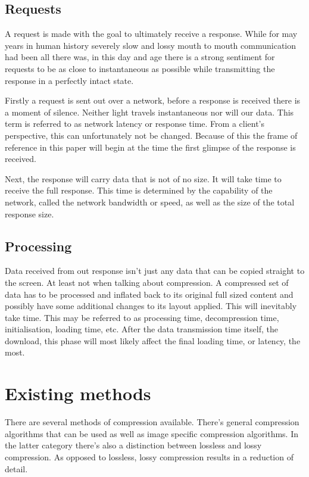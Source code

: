 \documentclass[11pt,a4paper]{report}
\begin{document}
\subsection{Requests}

A request is made with the goal to ultimately receive a response. While for may years in human history severely slow and lossy mouth to mouth communication had been all there was, in this day and age there is a strong sentiment for requests to be as close to instantaneous as possible while transmitting the response in a perfectly intact state.

Firstly a request is sent out over a network, before a response is received there is a moment of silence. Neither light travels instantaneous nor will our data. This term is referred to as network latency or response time. From a client's perspective, this can unfortunately not be changed. Because of this the frame of reference in this paper will begin at the time the first glimpse of the response is received.

Next, the response will carry data that is not of no size. It will take time to receive the full response. This time is determined by the capability of the network, called the network bandwidth or speed, as well as the size of the total response size.

\subsection{Processing}

Data received from out response isn't just any data that can be copied straight to the screen. At least not when talking about compression. A compressed set of data has to be processed and inflated back to its original full sized content and possibly have some additional changes to its layout applied. This will inevitably take time. This may be referred to as processing time, decompression time, initialisation, loading time, etc. After the data transmission time itself, the download, this phase will most likely affect the final loading time, or latency, the most.

\section{Existing methods}

There are several methods of compression available. There's general compression algorithms that can be used as well as image specific compression algorithms. In the latter category there's also a distinction between lossless and lossy compression. As opposed to lossless, lossy compression results in a reduction of detail.
\end{document}
